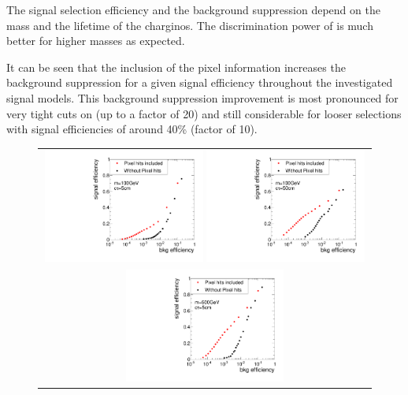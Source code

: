 The signal selection efficiency and the background suppression depend on the mass and the lifetime of the charginos.
The discrimination power of \ias is much better for higher masses as expected.

It can be seen that the inclusion of the pixel information increases the background suppression for a given signal efficiency throughout the investigated signal models.
This background suppression improvement is most pronounced for very tight cuts on \ias (up to a factor of 20) and still considerable for looser selections with signal efficiencies of around 40\% (factor of 10).

\begin{figure}[!bt]
  \centering 
  \vspace{79pt}
  \begin{tabular}{c}
    \includegraphics[width=0.49\textwidth]{figures/analysis/rocplot_wjets_mass_100GeV_ctau_5cm.pdf} 
    \includegraphics[width=0.49\textwidth]{figures/analysis/rocplot_wjets_mass_100GeV_ctau_50cm.pdf} \\
    \includegraphics[width=0.49\textwidth]{figures/analysis/rocplot_wjets_mass_500GeV_ctau_5cm.pdf} 

\end{tabular}
\end{figure}

